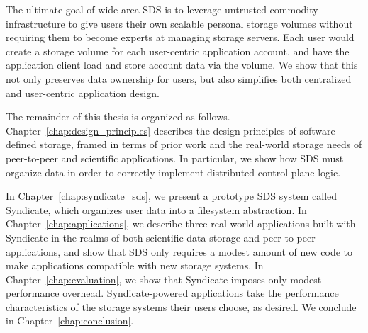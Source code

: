 
The ultimate goal of wide-area SDS is to leverage untrusted commodity infrastructure to
give users their own scalable personal storage volumes without requiring them
to become experts at managing storage servers.  Each user would create a storage
volume for each user-centric application account, and have the application
client load and store account data via the volume.  We show that this not only preserves data
ownership for users, but also simplifies both centralized and user-centric application design.

The remainder of this thesis is organized as follows.
Chapter~\ref{chap:design_principles} describes the design principles of
software-defined storage, framed in terms of prior work and the real-world
storage needs of peer-to-peer and scientific applications.  In particular, we show
how SDS must organize data in order to correctly implement distributed
control-plane logic.

In Chapter~\ref{chap:syndicate_sds}, we present a prototype SDS system called
Syndicate, which organizes user data into a filesystem abstraction.  In
Chapter~\ref{chap:applications}, we describe three real-world applications built
with Syndicate in the realms of both scientific data storage and peer-to-peer
applications, and show that SDS only requires a modest amount of new code to
make applications compatible with new storage systems.  In
Chapter~\ref{chap:evaluation}, we show that Syndicate imposes only modest
performance overhead.  Syndicate-powered applications take the performance
characteristics of the storage systems their users choose, as desired.  We
conclude in Chapter~\ref{chap:conclusion}.

